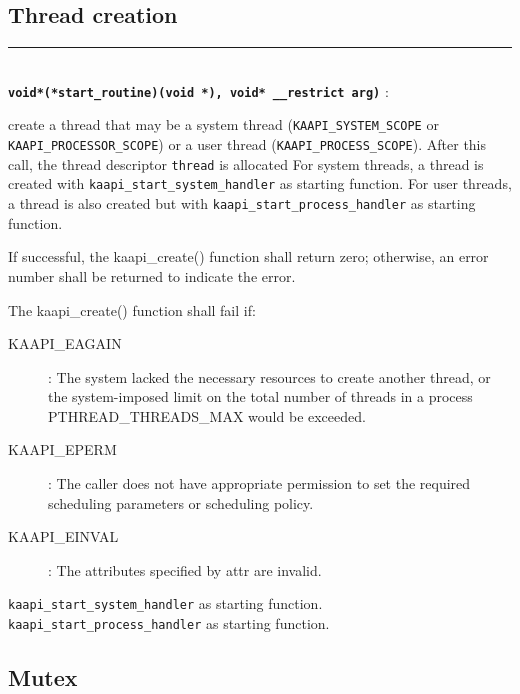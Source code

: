 \documentclass{report}
\begin{document}
\subsection{Thread creation}

\begin{description}
\vspace*{3ex} \hrule width 4cm
\item [\texttt{int kaapi\_create(kaapi\_t* \_\_restrict thread, const kaapi\_attr\_t* \_\_restrict attr,}]~\\
\textbf{\texttt{void*(*start\_routine)(void *), void* \_\_restrict arg)}} :

create a thread that may be a system thread (\verb+KAAPI_SYSTEM_SCOPE+ or
\verb+KAAPI_PROCESSOR_SCOPE+) or a user thread (\verb+KAAPI_PROCESS_SCOPE+).
After this call, the thread descriptor \verb+thread+ is allocated For system
threads, a thread is created with \verb+kaapi_start_system_handler+ as
starting function.  For user threads, a thread is also created but with
\verb+kaapi_start_process_handler+ as starting function.

If successful, the kaapi\_create() function shall return zero; otherwise, an
error number shall be returned to indicate the error.

The kaapi\_create() function shall fail if:

\begin{description}
\item [KAAPI\_EAGAIN]: The system lacked the necessary resources to create
  another thread, or the system-imposed limit on the total number of threads
  in a process {PTHREAD\_THREADS\_MAX} would be exceeded.
\item [KAAPI\_EPERM]: The caller does not have appropriate permission to set
  the required scheduling parameters or scheduling policy.
\item [KAAPI\_EINVAL]: The attributes specified by attr are invalid.
\end{description}

\end{description}

\verb+kaapi_start_system_handler+ as starting function.
\verb+kaapi_start_process_handler+ as starting function.



\subsection{Mutex}
\end{document}
